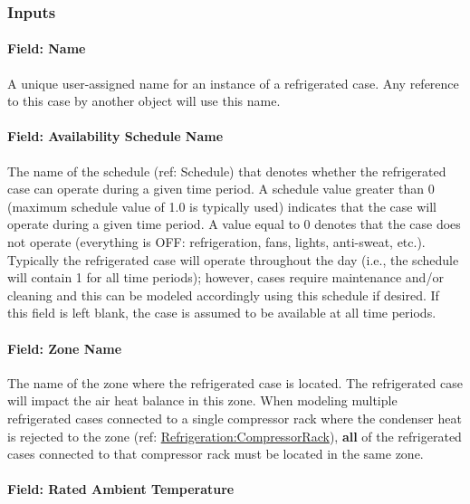 \subsubsection{Inputs}\label{inputs-1-036}

\paragraph{Field: Name}\label{field-name-1-035}

A unique user-assigned name for an instance of a refrigerated case. Any reference to this case by another object will use this name.

\paragraph{Field: Availability Schedule Name}\label{field-availability-schedule-name-014}

The name of the schedule (ref: Schedule) that denotes whether the refrigerated case can operate during a given time period. A schedule value greater than 0 (maximum schedule value of 1.0 is typically used) indicates that the case will operate during a given time period. A value equal to 0 denotes that the case does not operate (everything is OFF: refrigeration, fans, lights, anti-sweat, etc.). Typically the refrigerated case will operate throughout the day (i.e., the schedule will contain 1 for all time periods); however, cases require maintenance and/or cleaning and this can be modeled accordingly using this schedule if desired. If this field is left blank, the case is assumed to be available at all time periods.

\paragraph{Field: Zone Name}\label{field-zone-name-010}

The name of the zone where the refrigerated case is located. The refrigerated case will impact the air heat balance in this zone. When modeling multiple refrigerated cases connected to a single compressor rack where the condenser heat is rejected to the zone (ref: \hyperref[refrigerationcompressorrack]{Refrigeration:CompressorRack}), \textbf{all} of the refrigerated cases connected to that compressor rack must be located in the same zone.

\paragraph{Field: Rated Ambient Temperature}\label{field-rated-ambient-temperature}

